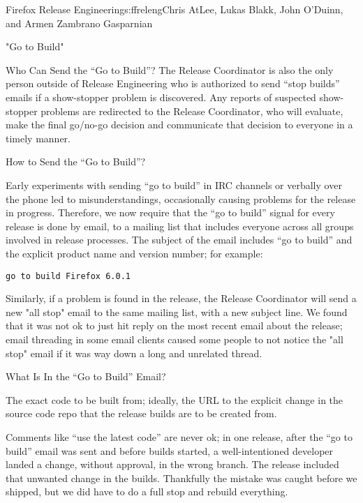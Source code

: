 \begin{aosachapter}{Firefox Release Engineering}{s:ffreleng}{Chris AtLee, Lukas Blakk, John O'Duinn, and Armen Zambrano Gasparnian}
\begin{aosasect1}{"Go to Build"}
\begin{aosasect2}{Who Can Send the ``Go to Build''?}
The Release Coordinator is also the only person outside of Release
Engineering who is authorized to send ``stop builds'' emails if a
show-stopper problem is discovered. Any reports of
suspected show-stopper problems are redirected to the Release
Coordinator, who will evaluate, make the final go/no-go decision and
communicate that decision to everyone in a timely manner.

\end{aosasect2}

\begin{aosasect2}{How to Send the ``Go to Build''?}

Early experiments with sending ``go to build'' in IRC channels or
verbally over the phone led to misunderstandings,
occasionally causing problems for the release in progress. Therefore,
we now require that the ``go to build'' signal for every release is
done by email, to a mailing list that includes everyone across all
groups involved in release processes. The subject of the email
includes ``go to build'' and the explicit product name and version
number; for example:

\begin{verbatim}
go to build Firefox 6.0.1
\end{verbatim}

Similarly, if a problem is found in the release, the Release
Coordinator will send a new "all stop" email to the same mailing list,
with a new subject line. We found that it was not ok to just hit reply
on the most recent email about the release; email threading in some
email clients caused some people to not notice the "all stop" email if
it was way down a long and unrelated thread.

\end{aosasect2}

\begin{aosasect2}{What Is In the ``Go to Build'' Email?}

\begin{aosaenumerate}

\item The exact code to be built from; ideally, the URL to the
explicit change in the source code repo that the release builds are
to be created from.

  \begin{aosaenumerate2}

    \item Comments like ``use the latest code'' are never ok; in one
      release, after the ``go to build'' email was sent and before
      builds started, a well-intentioned developer landed a change,
      without approval, in the wrong branch. The release included that
      unwanted change in the builds. Thankfully the mistake was
      caught before we shipped, but we did have to do a full stop and
      rebuild everything.


\end{aosaenumerate2}
\end{aosaenumerate}
\end{aosasect2}
\end{aosasect1}
\end{aosachapter}
